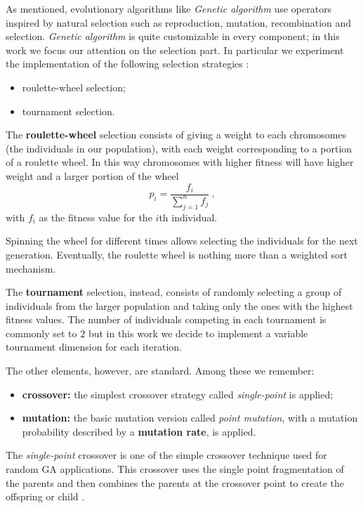 \documentclass[10pt]{article}
\begin{document}
As mentioned, evolutionary algorithms like \textit{Genetic algorithm} use operators inspired by natural selection such as reproduction, mutation, recombination and selection.
\textit{Genetic algorithm} is quite customizable in every component; in this work we focus our attention on the selection part.
In particular we experiment the implementation of the following selection strategies \cite{ventuno}:
\begin{itemize}
\item roulette-wheel selection;
\item tournament selection.
\end{itemize}
The \textbf{roulette-wheel} selection consists of giving a weight to each chromosomes (the individuals in our population), with each weight corresponding to a portion of a roulette wheel.
In this way chromosomes with higher fitness will have higher weight and a larger portion of the wheel
\begin{equation}
p_i = \frac{f_i}{\sum_{j = 1}^n f_j} ~,
\end{equation}
with $f_i$ as the fitness value for the $i$th individual.

Spinning the wheel for different times allows selecting the individuals for the next generation.
Eventually, the roulette wheel is nothing more than a weighted sort mechanism.

The \textbf{tournament} selection, instead, consists of randomly selecting a group of individuals from the larger population and taking only the ones with the highest fitness values. 
The number of individuals competing in each tournament is commonly set to $2$ but in this work we decide to implement a variable tournament dimension for each iteration.

The other elements, however, are standard.
Among these we remember:
\begin{itemize}
\item \textbf{crossover:} the simplest crossover strategy called \textit{single-point} is applied;
\item \textbf{mutation:} the basic mutation version called \textit{point mutation}, with a mutation probability described by a \textbf{mutation rate}, is applied.
\end{itemize}
The \textit{single-point} crossover is one of the simple crossover technique used for random GA applications. This crossover uses the single point fragmentation of the parents and then combines the parents at the crossover point to create the offspring or child \cite{venticinque}.
\end{document}
